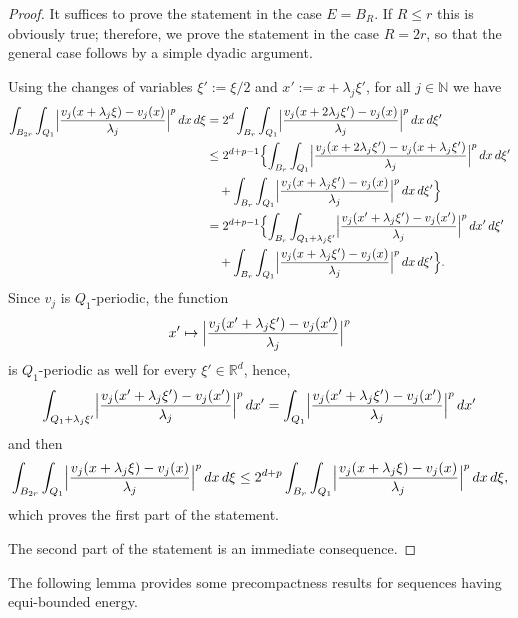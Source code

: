 \documentclass{article}
\theoremstyle{definition}
\newcommand{\N}{\mathbb{N}}
\newcommand{\R}{\mathbb{R}}
\begin{document}
\begin{proof}
It suffices to prove the statement in the case $E=B_R$. If $R\leq r$ this is obviously true; therefore, we prove the statement in the case $R=2r$, so that the general case follows by a simple dyadic argument. 

Using the changes of variables $\xi':=\xi/2$ and $x':=x+\lambda_j\xi'$, for all $j\in\N$ we have
    \begin{align*}
\int_{B_{2r}}\int_{Q_1}\Bigl|\frac{v_j(x+\lambda_j\xi)-v_j(x)}{\lambda_j}\Bigr|^p\, dx\, d\xi 
        & = 2^d \int_{B_{r}}\int_{Q_1}\Bigl|\frac{v_j(x+2\lambda_j\xi')-v_j(x)}{\lambda_j}\Bigr|^p\, dx\, d\xi' \\
        & \leq 2^{d+p-1} \Bigl\{ \int_{B_{r}}\int_{Q_1}\Bigl|\frac{v_j(x+2\lambda_j\xi')-v_j(x+\lambda_j\xi')}{\lambda_j}\Bigr|^p\, dx\, d\xi' \\
        & \quad + \int_{B_{r}}\int_{Q_1}\Bigl|\frac{v_j(x+\lambda_j\xi')-v_j(x)}{\lambda_j}\Bigr|^p\, dx\, d\xi' \Bigr\} \\
        & = 2^{d+p-1}\Bigl\{\int_{B_{r}}\int_{Q_1+\lambda_j\xi'}\Bigl|\frac{v_j(x'+\lambda_j\xi')-v_j(x')}{\lambda_j}\Bigr|^p\, dx'\, d\xi' \\
        & \quad + \int_{B_{r}}\int_{Q_1}\Bigl|\frac{v_j(x+\lambda_j\xi')-v_j(x)}{\lambda_j}\Bigr|^p\, dx\, d\xi' \Bigr\}.
    \end{align*}
Since $v_j$ is $Q_1$-periodic, the function
\begin{equation*}
    x'\mapsto \Bigl|\frac{v_j(x'+\lambda_j\xi')-v_j(x')}{\lambda_j}\Bigr|^p
\end{equation*}
is $Q_1$-periodic as well for every $\xi'\in \R^d$, hence,
\begin{equation*}
\int_{Q_1+\lambda_j\xi'}\Bigl|\frac{v_j(x'+\lambda_j\xi')-v_j(x')}{\lambda_j}\Bigr|^p\, dx' = \int_{Q_1}\Bigl|\frac{v_j(x'+\lambda_j\xi')-v_j(x')}{\lambda_j}\Bigr|^p\, dx'
\end{equation*}
    and then 
    \begin{equation*} \int_{B_{2r}}\int_{Q_1}\Bigl|\frac{v_j(x+\lambda_j\xi)-v_j(x)}{\lambda_j}\Bigr|^p\, dx\, d\xi \leq 2^{d+p}\int_{B_{r}}\int_{Q_1}\Bigl|\frac{v_j(x+\lambda_j\xi)-v_j(x)}{\lambda_j}\Bigr|^p\, dx\, d\xi,
    \end{equation*}
    which proves the first part of the statement.

    The second part of the statement is an immediate consequence. 
\end{proof}

The following lemma provides some precompactness results for sequences having equi-bounded energy.
\end{document}
